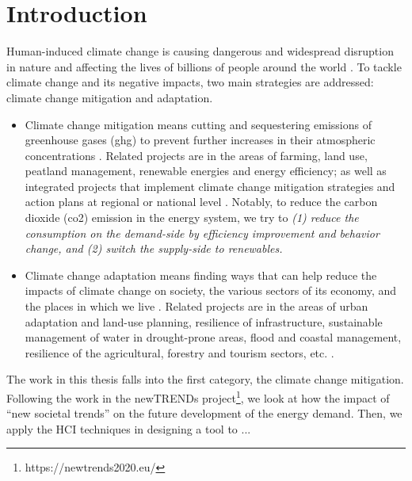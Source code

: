 \chapter{Introduction}

Human-induced climate change is causing dangerous and widespread disruption in nature and affecting the lives of billions of people around the world \cite{ipcc}. 
To tackle climate change and its negative impacts, two main strategies are addressed: climate change mitigation and adaptation.

\begin{itemize}
  \item Climate change mitigation means cutting and sequestering emissions of greenhouse gases (\gls{ghg}) to prevent further increases in their atmospheric concentrations \cite{handbook}.
Related projects are in the areas of farming, land use, peatland management, renewable energies and energy efficiency; as well as integrated projects that implement climate change mitigation strategies and action plans at regional or national level \cite{ec}.
Notably, to reduce the carbon dioxide (\gls{co2}) emission in the energy system,
we try to 
\emph{
  (1) reduce the consumption on the demand-side by efficiency improvement and behavior change, and 
  (2) switch the supply-side to renewables. 
}

  \item Climate change adaptation means finding ways that can help reduce the impacts of climate change on society, the various sectors of its economy, and the places in which we live \cite{handbook}.
Related projects are in the areas of urban adaptation and land-use planning, resilience of infrastructure, sustainable management of water in drought-prone areas, flood and coastal management, resilience of the agricultural, forestry and tourism sectors, etc. \cite{ec}.  
\end{itemize}

The work in this thesis falls into the first category, the climate change mitigation.
Following the work in the newTRENDs project\footnote{https://newtrends2020.eu/}, %
we look at how the impact of ``new societal trends'' on the future development of the energy demand.
Then, we apply the HCI techniques in designing a tool to ...  %




